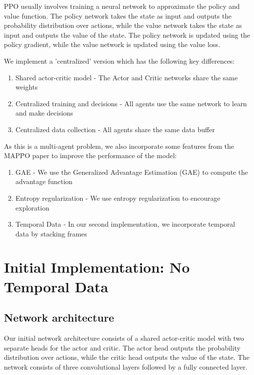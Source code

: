 \documentclass{article}
\begin{document}
PPO usually involves training a neural network to approximate the policy and value function. The policy
network takes the state as input and outputs the probability distribution over actions, while the value network
takes the state as input and outputs the value of the state. The policy network is updated using the policy gradient,
while the value network is updated using the value loss.

\pagebreak

We implement a 'centralized' version which has the following key differences:
\begin{enumerate}
  \item Shared actor-critic model - The Actor and Critic networks share the same weights
  \item Centralized training and decisions - All agents use the same network to learn and make decisions
  \item Centralized data collection - All agents share the same data buffer
\end{enumerate}

As this is a multi-agent problem, we also incorporate some features from the MAPPO\cite{DBLP:journals/corr/abs-2103-01955} paper to improve the performance of the model:
\begin{enumerate}
  \item GAE - We use the Generalized Advantage Estimation (GAE) to compute the advantage function
  \item Entropy regularization - We use entropy regularization to encourage exploration
  \item Temporal Data - In our second implementation, we incorporate temporal data by stacking frames
\end{enumerate}


\section{Initial Implementation: No Temporal Data}

\subsection{Network architecture}
Our initial network architecture consists of a shared actor-critic model with two separate heads for the actor and critic.
The actor head outputs the probability distribution over actions, while the critic head outputs the value of the state.
The network consists of three convolutional layers followed by a fully connected layer.
\end{document}
